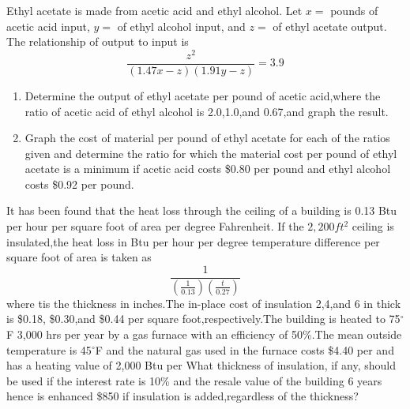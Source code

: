\begin{exercises}
    \begin{exercise}
    \label{sea-09-05}
        Ethyl acetate is made from acetic acid and ethyl alcohol. Let $x=$ pounds of acetic acid input, $y=$ of ethyl alcohol input, and $z=$ of ethyl acetate output. The relationship of output to input is
        \begin{equation}
            \frac{z^2}{(1.47x-z)(1.91y-z)}=3.9
        \end{equation}
        \begin{enumerate}[label=\alph*)]
            \item Determine the output of ethyl acetate per pound of acetic acid,where the ratio of acetic acid of ethyl alcohol is 2.0,1.0,and 0.67,and graph the result.
            \item Graph the cost of material per pound of ethyl acetate for each of the ratios given and determine the ratio for which the material cost per pound of ethyl acetate is a minimum if acetic acid costs \$0.80 per pound and ethyl alcohol costs \$0.92 per pound.
        \end{enumerate}
    \end{exercise}
    \begin{solution}
    \end{solution}
    
    \begin{exercise}
    \label{sea-09-06}
        It has been found that the heat loss through the ceiling of a building is 0.13 Btu per hour per square foot of area per degree Fahrenheit. If the $2,200ft^2$ ceiling is insulated,the heat loss in Btu per hour per degree temperature difference per square foot of area is taken as
        \begin{equation}
            \frac{1}{(\frac{1}{0.13})(\frac{t}{0.27})}
        \end{equation}
        where tis the thickness in inches.The in-place cost of insulation 2,4,and 6 in thick is \$0.18, \$0.30,and \$0.44 per square foot,respectively.The building is heated to 75$^{\circ}$F 3,000 hrs per year by a gas furnace with an efficiency of 50\%.The mean outside temperature is 45$^{\circ}$F and the natural gas used in the furnace costs \$4.40 per and has a heating value of 2,000 Btu per What thickness of insulation, if any, should be used if the interest rate is 10\% and the resale value of the building 6 years hence is enhanced \$850 if insulation is added,regardless of the thickness?
    \end{exercise}
    \begin{solution}
    \end{solution}
    

\end{exercises}
